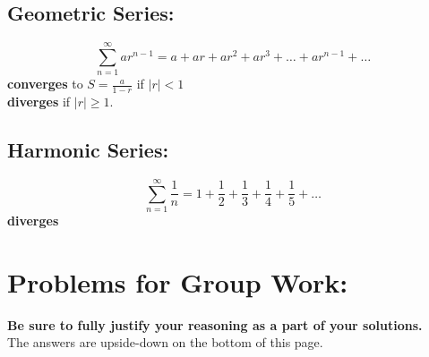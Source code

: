 




\subsection*{Geometric Series:}
\[ \sum_{n=1}^\infty a r^{n-1} = a+ ar+ ar^2+ ar^3+ \ldots+ ar^{n-1}+\ldots \]
\textbf{converges} to \(S=\frac{a}{1-r}\) if \(|r|<1\)\\
 \textbf{diverges} if \(|r|\geq 1\).\\

\vspace*{.1in}
\vspace*{.2in}

\subsection*{Harmonic Series:} 
\[ \sum_{n=1}^\infty \frac{1}{n} = 1+\frac{1}{2}+\frac{1}{3}+\frac{1}{4}+\frac{1}{5}+\ldots \]
\textbf{diverges}


\vspace*{-.1in}




\vspace*{-.55in}

\pagebreak

\section*{Problems for Group Work:}
\textbf{Be sure to fully justify your reasoning as a part of your solutions.}\\
 The answers are upside-down on the bottom of this page.

